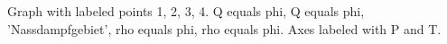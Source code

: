 Graph with labeled points 1, 2, 3, 4.  
Q equals phi, Q equals phi, 'Nassdampfgebiet', rho equals phi, rho equals phi.  
Axes labeled with P and T.